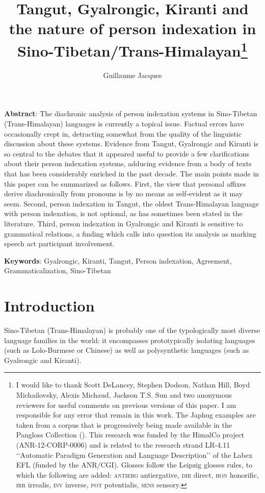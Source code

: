 \documentclass[oldfontcommands,oneside,a4paper,11pt]{article}
\begin{document}
 
\title{Tangut, Gyalrongic, Kiranti and the nature of person indexation in Sino-Tibetan/Trans-Himalayan\footnote{I would like to thank Scott DeLancey, Stephen Dodson, Nathan Hill, Boyd Michailovsky, Alexis Michaud, Jackson T.S. Sun and two anonymous reviewers for useful comments on previous versions of this paper. I am responsible for any error that remain in this work. The Japhug examples are taken from a corpus that is progressively being made available in the Pangloss Collection (\citealt{michailovsky14pangloss}). This research was funded by the HimalCo project (ANR-12-CORP-0006) and is related to the research strand LR-4.11 ‘‘Automatic Paradigm Generation and Language Description’’ of the Labex EFL (funded by the ANR/CGI). Glosses follow the Leipzig glosses rules, to which the following are added: \textsc{antierg} antiergative, \textsc{dir} direct, \textsc{hon} honorific, \textsc{irr} irrealis, \textsc{inv} inverse, \textsc{pot} potentialis, \textsc{sens} sensory.}}
\author{Guillaume Jacques}
\maketitle

\textbf{Abstract}: The diachronic analysis of person indexation systems in Sino-Tibetan (Trans-Himalayan) languages is currently a topical issue. Factual errors have occasionally crept in, detracting somewhat from the quality of the linguistic discussion about these systems. Evidence from Tangut, Gyalrongic and Kiranti is so central to the debates that it appeared useful to provide a few clarifications about their person indexation systems, adducing evidence from a body of texts that has been considerably enriched in the past decade. The main points made in this paper can be summarized as follows. First, the view that personal affixes derive diachronically from pronouns is by no means as self-evident as it may seem. Second, person indexation in Tangut, the oldest Trans-Himalayan language with person indexation, is not optional, as has sometimes been stated in the literature. Third, person indexation in Gyalrongic and Kiranti is sensitive to grammatical relations, a finding which calls into question its analysis as marking speech act participant involvement.

\textbf{Keywords}: Gyalrongic, Kiranti, Tangut, Person indexation, Agreement, Grammaticalization, Sino-Tibetan

\section{Introduction}
Sino-Tibetan (Trans-Himalayan) is probably one of the typologically most diverse language families in the world: it encompasses prototypically isolating languages (such as Lolo-Burmese or Chinese) as well as polysynthetic languages (such as Gyalrongic and Kiranti). 
\end{document}
